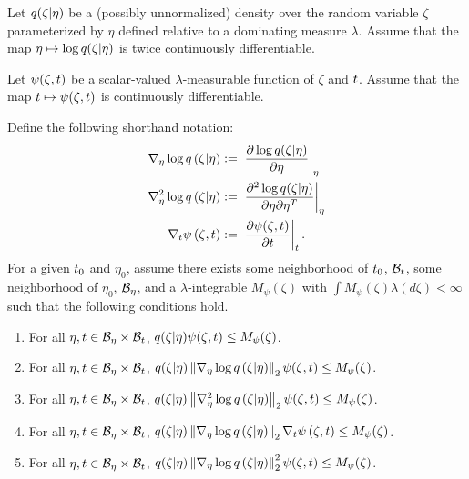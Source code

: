 

\begin{assu}
%
%
Let $q(\zeta \vert \eta)$ be a (possibly unnormalized) density over the random
variable $\zeta$ parameterized by $\eta$ defined relative to a dominating
measure $\lambda$.  Assume that the map $\eta \mapsto \log q(\zeta \vert \eta)$
is twice continuously differentiable.

Let $\psi(\zeta, t)$ be a scalar-valued $\lambda$-measurable function of
$\zeta$ and $t$.  Assume that the map $t \mapsto \psi(\zeta, t)$ is
continuously differentiable.

Define the following shorthand notation:
%
\begin{align*}
%
\lqgrad{\zeta \vert \eta} :={}&
    \fracat{\partial \log \q(\zeta \vert \eta)}{\partial \eta}{\eta} \\
%
\lqhess{\zeta \vert \eta} :={}&
    \fracat{\partial^2 \log \q(\zeta \vert \eta)}
           {\partial \eta \partial \eta^T}{\eta} \\
%
\psigrad{\zeta, \t} :={}& \fracat{\partial \psi(\zeta, \t)}{\partial \t}{\t}.
%
\end{align*}
%
For a given $t_0$ and $\eta_0$, assume there exists some neighborhood of
$t_0$, $\mathcal{B}_t$, some neighborhood of $\eta_0$, $\mathcal{B}_\eta$, and a
$\lambda$-integrable $M_\psi(\zeta)$ with $\int M_\psi(\zeta) \lambda(d\zeta) <
\infty$ such that the following conditions hold.
%
\begin{enumerate}
%
%
\item {} For all $\eta, t \in \mathcal{B}_\eta \times \mathcal{B}_t$,
$q(\zeta \vert \eta) \psi(\zeta, t) \le M_\psi(\zeta)$.
%
\item {} For all $\eta, t \in \mathcal{B}_\eta \times \mathcal{B}_t$,
$q(\zeta \vert \eta) \left\Vert{\nabla_\eta \log q}\left(\zeta \vert \eta\right)\right\Vert_2 \psi(\zeta, t) \le
M_\psi(\zeta)$.
%
\item {} For all $\eta, t \in \mathcal{B}_\eta \times \mathcal{B}_t$,
$q(\zeta \vert \eta) \left\Vert{\nabla_\eta^2 \log q}\left(\zeta \vert \eta\right)\right\Vert_2 \psi(\zeta, t) \le
M_\psi(\zeta)$.
%
\item {} For all $\eta, t \in \mathcal{B}_\eta \times \mathcal{B}_t$,
$q(\zeta \vert \eta) \left\Vert{\nabla_\eta \log q}\left(\zeta \vert \eta\right)\right\Vert_2 {\nabla_t \psi}\left(\zeta, t\right)
\le M_\psi(\zeta)$.
%
\item {} For all $\eta, t \in \mathcal{B}_\eta \times \mathcal{B}_t$,
$q(\zeta \vert \eta) \left\Vert{\nabla_\eta \log q}\left(\zeta \vert \eta\right)\right\Vert^2_2 \psi(\zeta, t) \le
M_\psi(\zeta)$.
%
\end{enumerate}
%
\end{assu}

